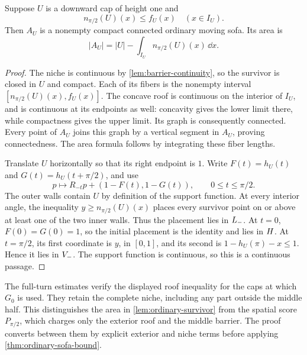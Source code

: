 \begin{lemma}\label{lem:ordinary-survivor}
Suppose $U$ is a downward cap of height one and
\[
 n_{\pi/2}(U)(x)\le f_U(x)\quad(x\in I_U).
\]
Then $A_U$ is a nonempty compact connected ordinary moving sofa.
Its area is
\[
 |A_U|=|U|-\int_{I_U}n_{\pi/2}(U)(x)\,\dd x.
\]
\end{lemma}
\begin{proof}
The niche is continuous by \cref{lem:barrier-continuity}, so the
survivor is closed in $U$ and compact. Each of its fibers is the
nonempty interval $[n_{\pi/2}(U)(x),f_U(x)]$. The concave roof
is continuous on the interior of $I_U$, and is continuous at its
endpoints as well: concavity gives the lower limit there, while
compactness gives the upper limit. Its graph is consequently
connected. Every point of $A_U$ joins this graph by a vertical
segment in $A_U$, proving connectedness. The area formula follows
by integrating these fiber lengths.

Translate $U$ horizontally so that its right endpoint is $1$.
Write $F(t)=h_U(t)$ and $G(t)=h_U(t+\pi/2)$, and use
\[
 p\longmapsto R_{-t}p+(1-F(t),1-G(t)),\qquad
                 0\le t\le\pi/2.
\]
The outer walls contain $U$ by definition of the support function.
At every interior angle, the inequality $y\ge n_{\pi/2}(U)(x)$
places every survivor point on or above at least one of the two
inner walls. Thus the placement lies in $L_-$. At $t=0$,
$F(0)=G(0)=1$, so the initial placement is the identity and lies
in $H$. At $t=\pi/2$, its first coordinate is $y$, in $[0,1]$,
and its second is $1-h_U(\pi)-x\le1$. Hence it lies in $V_-$.
The support function is continuous, so this is a continuous passage.
\end{proof}

The full-turn estimates verify the displayed roof inequality for
the caps at which $G_0$ is used. They retain the complete niche,
including any part outside the middle half. This distinguishes the
area in \cref{lem:ordinary-survivor} from the spatial score
$P_{\pi/2}$, which charges only the exterior roof and the middle
barrier. The proof converts between them by explicit exterior and
niche terms before applying \cref{thm:ordinary-sofa-bound}.

